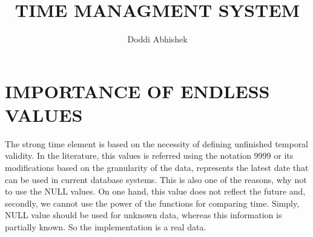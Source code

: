 \documentclass{article}
\title{TIME MANAGMENT SYSTEM}
\author{Doddi Abhishek}
\begin{document}
\maketitle





\section{IMPORTANCE OF ENDLESS VALUES}
The strong time element is based on the necessity of defining unfinished temporal validity. In the literature, this values
is referred using the notation 9999 or its modifications based on the granularity of the data, represents the latest date
that can be used in current database systems.
This is also one of the reasons, why not to use the NULL values. On one hand, this value does not reflect the future
and, secondly, we cannot use the power of the functions for comparing time. Simply, NULL value should be used for
unknown data, whereas this information is partially known. So the implementation is a real data.
\end{document}

